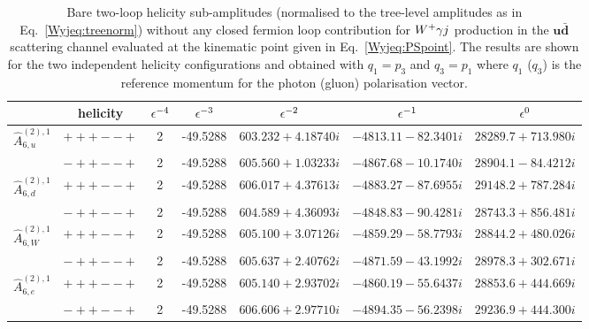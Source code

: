 \documentclass[main.tex]{subfiles}
\begin{document}
\begin{table}[t!]
\centering
\begin{tabularx}{1.0\textwidth}{|C{0.7}|C{1.0}|C{0.6}|C{1.0}|C{1.2}|C{1.2}|C{1.3}|}
\hline
      & helicity & $\epsilon^{-4}$ & $\epsilon^{-3}$ & $\epsilon^{-2}$ & $\epsilon^{-1}$ & $\epsilon^{0}$ \\
\hline
$\hat A^{(2),1}_{6,u}$ & $\scriptstyle +++--+$ & 2 & -49.5288 & $603.232 + 4.18740 i$ & $-4813.11 - 82.3401 i$ & $28289.7 + 713.980 i$ \\
                   & $\scriptstyle -++--+$ & 2 & -49.5288 & $605.560 + 1.03233 i$ & $-4867.68 - 10.1740 i$ & $28904.1 - 84.4212 i$ \\
\hline
$\hat A^{(2),1}_{6,d}$ & $\scriptstyle +++--+$ & 2 & -49.5288 & $606.017 + 4.37613 i$ & $-4883.27 - 87.6955 i$ & $29148.2 + 787.284 i$ \\
                   & $\scriptstyle -++--+$ & 2 & -49.5288 & $604.589 + 4.36093 i$ & $-4848.83 - 90.4281 i$ & $28743.3 + 856.481 i$ \\
\hline
$\hat A^{(2),1}_{6,W}$ & $\scriptstyle +++--+$ & 2 & -49.5288 & $605.100 + 3.07126 i$ & $-4859.29 - 58.7793 i$ & $28844.2 + 480.026 i$ \\
                   & $\scriptstyle -++--+$ & 2 & -49.5288 & $605.637 + 2.40762 i$ & $-4871.59 - 43.1992 i$ & $28978.3 + 302.671 i$ \\
\hline
$\hat A^{(2),1}_{6,e}$ & $\scriptstyle +++--+$ & 2 & -49.5288 & $605.140 + 2.93702 i$ & $-4860.19 - 55.6437 i$ & $28853.6 + 444.669 i$ \\
                   & $\scriptstyle -++--+$ & 2 & -49.5288 & $606.606 + 2.97710 i$ & $-4894.35 - 56.2398 i$ & $29236.9 + 444.300 i$ \\
\hline
\end{tabularx}
\caption{\label{Wyjtab:benchmark2Lnf0bare} 
Bare two-loop helicity sub-amplitudes (normalised to the tree-level amplitudes as in Eq.~\ref{Wyjeq:treenorm}) without any closed fermion loop contribution 
for $W^+\gamma j$ production in the $\mathbf{u\bar{d}}$ scattering channel 
evaluated at the kinematic point given in Eq.~\ref{Wyjeq:PSpoint}. The results are shown for the two independent helicity configurations and obtained with $q_1 = p_3$ and $q_3 = p_1$ where $q_1$ ($q_3$) is the 
reference momentum for the photon (gluon) polarisation vector.
}
\end{table}
%
\end{document}
